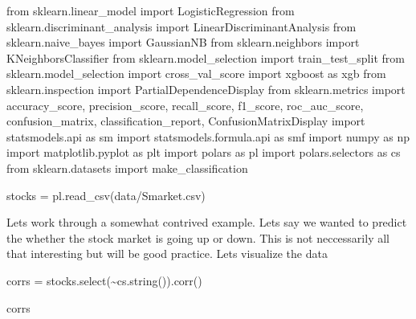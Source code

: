 \documentclass[
  letterpaper,
  DIV=11,
  numbers=noendperiod]{scrreprt}
\newenvironment{Shaded}{\begin{snugshade}}{\end{snugshade}}
\newcommand{\ImportTok}[1]{\textcolor[rgb]{0.00,0.46,0.62}{#1}}
\newcommand{\NormalTok}[1]{\textcolor[rgb]{0.00,0.23,0.31}{#1}}
\newcommand{\OperatorTok}[1]{\textcolor[rgb]{0.37,0.37,0.37}{#1}}
\newcommand{\StringTok}[1]{\textcolor[rgb]{0.13,0.47,0.30}{#1}}
\begin{document}
\begin{Shaded}
\begin{Highlighting}[]
\ImportTok{from}\NormalTok{ sklearn.linear\_model }\ImportTok{import}\NormalTok{ LogisticRegression}
\ImportTok{from}\NormalTok{ sklearn.discriminant\_analysis }\ImportTok{import}\NormalTok{ LinearDiscriminantAnalysis}
\ImportTok{from}\NormalTok{ sklearn.naive\_bayes }\ImportTok{import}\NormalTok{ GaussianNB}
\ImportTok{from}\NormalTok{ sklearn.neighbors }\ImportTok{import}\NormalTok{ KNeighborsClassifier}
\ImportTok{from}\NormalTok{ sklearn.model\_selection }\ImportTok{import}\NormalTok{ train\_test\_split}
\ImportTok{from}\NormalTok{ sklearn.model\_selection }\ImportTok{import}\NormalTok{ cross\_val\_score}
\ImportTok{import}\NormalTok{ xgboost }\ImportTok{as}\NormalTok{ xgb}
\ImportTok{from}\NormalTok{ sklearn.inspection }\ImportTok{import}\NormalTok{ PartialDependenceDisplay}
\ImportTok{from}\NormalTok{ sklearn.metrics }\ImportTok{import}\NormalTok{ accuracy\_score, precision\_score, recall\_score, f1\_score, roc\_auc\_score, confusion\_matrix, classification\_report, ConfusionMatrixDisplay}
\ImportTok{import}\NormalTok{ statsmodels.api }\ImportTok{as}\NormalTok{ sm}
\ImportTok{import}\NormalTok{ statsmodels.formula.api }\ImportTok{as}\NormalTok{ smf}
\ImportTok{import}\NormalTok{ numpy }\ImportTok{as}\NormalTok{ np}
\ImportTok{import}\NormalTok{ matplotlib.pyplot }\ImportTok{as}\NormalTok{ plt}
\ImportTok{import}\NormalTok{ polars }\ImportTok{as}\NormalTok{ pl }
\ImportTok{import}\NormalTok{ polars.selectors }\ImportTok{as}\NormalTok{ cs }
\ImportTok{from}\NormalTok{ sklearn.datasets }\ImportTok{import}\NormalTok{ make\_classification}

\NormalTok{stocks }\OperatorTok{=}\NormalTok{ pl.read\_csv(}\StringTok{\textquotesingle{}data/Smarket.csv\textquotesingle{}}\NormalTok{)}
\end{Highlighting}
\end{Shaded}

Lets work through a somewhat contrived example. Lets say we wanted to
predict the whether the stock market is going up or down. This is not
neccessarily all that interesting but will be good practice. Lets
visualize the data

\begin{Shaded}
\begin{Highlighting}[]
\NormalTok{corrs }\OperatorTok{=}\NormalTok{ stocks.select(}\OperatorTok{\textasciitilde{}}\NormalTok{cs.string()).corr()}

\NormalTok{corrs }
\end{Highlighting}
\end{Shaded}
\end{document}
